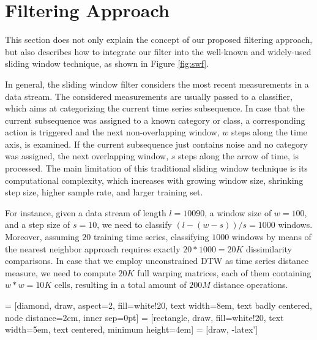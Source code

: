 \section{Filtering Approach} \label{filtering_approach}

This section does not only explain the concept of our proposed filtering approach, but also describes how to integrate our filter into the well-known and widely-used sliding window technique, as shown in Figure \ref{fig:swf}.  

In general, the sliding window filter considers the most recent measurements in a data stream. The considered measurements are usually passed to a classifier, which aims at categorizing the current time series subsequence. In case that the current subsequence was assigned to a known category or class, a corresponding action is triggered and the next non-overlapping window, $w$ steps along the time axis, is examined. If the current subsequence just contains noise and no category was assigned, the next overlapping window, $s$ steps along the arrow of time, is processed. The main limitation of this traditional sliding window technique is its computational complexity, which increases with growing window size, shrinking step size, higher sample rate, and larger training set. %

For instance, given a data stream of length $l {=} 10090$, a window size of $w {=} 100$, and a step size of $s {=} 10$, we need to classify $(l - (w - s)) / s = 1000$ windows. Moreover, assuming $20$ training time series, classifying $1000$ windows by means of the nearest neighbor approach requires exactly $20*1000=20K$ dissimilarity comparisons. In case that we employ unconstrained DTW as time series distance measure, we need to compute $20K$ full warping matrices, each of them containing $w*w = 10K$ cells, resulting in a total amount of $200M$ distance operations. 


 = [diamond, draw, aspect=2, fill=white!20, text width=8em, text badly centered, node distance=2cm, inner sep=0pt]
 = [rectangle, draw, fill=white!20, text width=5em, text centered, minimum height=4em]
 = [draw, -latex']

